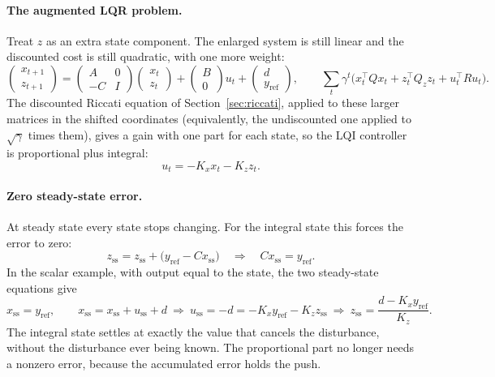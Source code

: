 \documentclass[11pt]{article}
\begin{document}
\paragraph{The augmented LQR problem.} Treat $z$ as an extra state component. The enlarged system is
still linear and the discounted cost is still quadratic, with one more weight:
\[
  \begin{pmatrix} x_{t+1} \\ z_{t+1} \end{pmatrix}
  = \begin{pmatrix} A & 0 \\ -C & I \end{pmatrix}
    \begin{pmatrix} x_t \\ z_t \end{pmatrix}
  + \begin{pmatrix} B \\ 0 \end{pmatrix} u_t
  + \begin{pmatrix} d \\ y_{\mathrm{ref}} \end{pmatrix},
  \qquad
  \sum_t \gamma^t \Big( x_t^\top Q x_t + z_t^\top Q_z z_t + u_t^\top R u_t \Big).
\]
The discounted Riccati equation of Section~\ref{sec:riccati}, applied to these larger matrices in the
shifted coordinates (equivalently, the undiscounted one applied to $\sqrt{\gamma}$ times them), gives a
gain with one part for each state, so the LQI controller is proportional plus integral:
\[
  u_t = -K_x x_t - K_z z_t .
\]

\paragraph{Zero steady-state error.} At steady state every state stops changing. For the integral
state this forces the error to zero:
\[
  z_{\mathrm{ss}} = z_{\mathrm{ss}} + \big(y_{\mathrm{ref}} - C x_{\mathrm{ss}}\big)
  \quad\Longrightarrow\quad C x_{\mathrm{ss}} = y_{\mathrm{ref}} .
\]
In the scalar example, with output equal to the state, the two steady-state equations give
\[
  x_{\mathrm{ss}} = y_{\mathrm{ref}}, \qquad
  x_{\mathrm{ss}} = x_{\mathrm{ss}} + u_{\mathrm{ss}} + d
  \ \Longrightarrow\ u_{\mathrm{ss}} = -d = -K_x y_{\mathrm{ref}} - K_z z_{\mathrm{ss}}
  \ \Longrightarrow\ z_{\mathrm{ss}} = \frac{d - K_x y_{\mathrm{ref}}}{K_z} .
\]
The integral state settles at exactly the value that cancels the disturbance, without the
disturbance ever being known. The proportional part no longer needs a nonzero error, because the
accumulated error holds the push.
\end{document}
